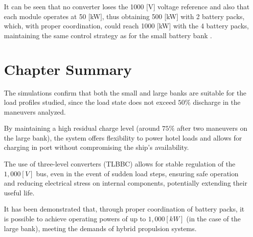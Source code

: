 It can be seen that no converter loses the 1000 [V] voltage reference and also that each module operates at 50 [kW], thus obtaining 500 [kW] with 2 battery packs, which, with proper coordination, could reach 1000 [kW] with the 4 battery packs, maintaining the same control strategy as for the small battery bank \cite{Zhang}\cite{sensata}.

\section{Chapter Summary}

The simulations confirm that both the small and large banks are suitable for the load profiles studied, since the load state does not exceed $50\%$ discharge in the maneuvers analyzed.

By maintaining a high residual charge level (around $75\%$ after two maneuvers on the large bank), the system offers flexibility to power hotel loads and allows for charging in port without compromising the ship's availability.

The use of three-level converters (TLBBC) allows for stable regulation of the $1,000[V]$ bus, even in the event of sudden load steps, ensuring safe operation and reducing electrical stress on internal components, potentially extending their useful life.

It has been demonstrated that, through proper coordination of battery packs, it is possible to achieve operating powers of up to $1,000[kW]$ (in the case of the large bank), meeting the demands of hybrid propulsion systems.


